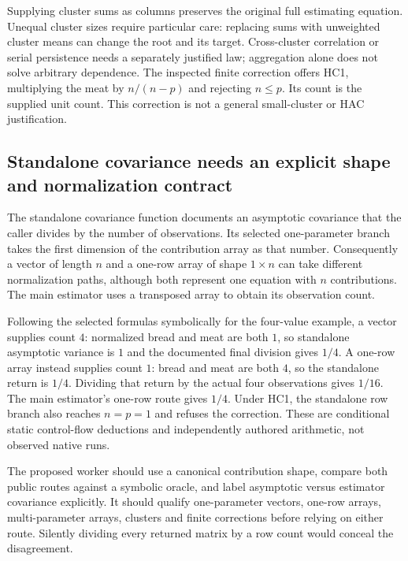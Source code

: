 Supplying cluster sums as columns preserves the original full estimating
equation. Unequal cluster sizes require particular care: replacing sums
with unweighted cluster means can change the root and its target.
Cross-cluster correlation or serial persistence needs a separately
justified law; aggregation alone does not solve arbitrary dependence.
The inspected finite correction offers HC1, multiplying the meat by
$n/(n-p)$ and rejecting $n\leq p$. Its count is the supplied unit count.
This correction is not a general small-cluster or HAC justification.
\citep{exec24_delicatessen_source,exec24_delicatessen_choice}

\subsection{Standalone covariance needs an explicit shape and normalization contract}
The standalone covariance function documents an asymptotic covariance
that the caller divides by the number of observations. Its selected
one-parameter branch takes the first dimension of the contribution array
as that number. Consequently a vector of length $n$ and a one-row array
of shape $1\times n$ can take different normalization paths, although
both represent one equation with $n$ contributions. The main estimator
uses a transposed array to obtain its observation count.
\citep{exec24_delicatessen_source}

Following the selected formulas symbolically for the four-value example,
a vector supplies count $4$: normalized bread and meat are both $1$,
so standalone asymptotic variance is $1$ and the documented final division
gives $1/4$. A one-row array instead supplies count $1$: bread and meat
are both $4$, so the standalone return is $1/4$. Dividing that return by
the actual four observations gives $1/16$. The main estimator's one-row
route gives $1/4$. Under HC1, the standalone row branch also reaches
$n=p=1$ and refuses the correction. These are conditional static
control-flow deductions and independently authored arithmetic, not
observed native runs.\citep{exec24_delicatessen_source,exec24_delicatessen_choice}

The proposed worker should use a canonical contribution shape, compare
both public routes against a symbolic oracle, and label asymptotic versus
estimator covariance explicitly. It should qualify one-parameter vectors,
one-row arrays, multi-parameter arrays, clusters and finite corrections
before relying on either route. Silently dividing every returned matrix
by a row count would conceal the disagreement.
\citep{exec24_delicatessen_choice}

